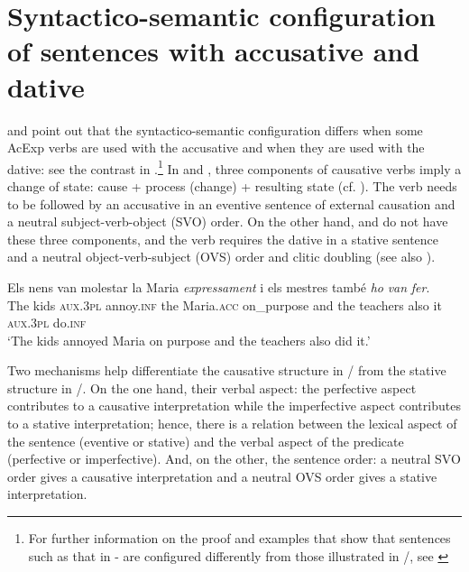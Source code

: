 \documentclass[output=paper,colorlinks,citecolor=brown,nonflat,modfonts]{langsci/langscibook}
\begin{document}
\section{Syntactico-semantic configuration of sentences with accusative and dative}\label{sec:royo:2}

\citet{Ynglès1991} and \citet{CabréMateu1998} point out that the syntactico-semantic configuration differs when some AcExp verbs are used with the accusative and when they are used with the dative: see the contrast in .\footnote{For further information on the proof and examples that show that sentences such as that in  - are configured differently from those illustrated in /, see \citet[Section 4.1]{Royo2017}} In  and , three components of causative verbs imply a change of state: cause + process (change) + resulting state (cf. \citealt{LevinRappaportHovav1995, CabréMateu1998, Rossello2008}). The verb needs to be followed by an accusative in an eventive sentence of external causation and a neutral subject-verb-object (SVO) order. On the other hand,  and  do not have these three components, and the verb requires the dative in a stative sentence and a neutral object-verb-subject (OVS) order and clitic doubling (see also ).

\ea%
 \label{ex:royo:3}
 \ea \label{ex:royo:3a}
 \gll Els nens van molestar la Maria \emph{expressament} i els mestres també \emph{ho} \emph{van} \emph{fer}. \\
The kids \textsc{aux.3pl} annoy.\textsc{inf} the Maria.\textsc{acc} on\_purpose     and the teachers also     it  \textsc{aux.3pl} do.\textsc{inf}\\
 \glt ‘The kids annoyed Maria on purpose and the teachers also did it.’
 
 \z
 \z

Two mechanisms help differentiate the causative structure in / from the stative structure in /. On the one hand, their verbal aspect: the perfective aspect contributes to a causative interpretation while the imperfective aspect contributes to a stative interpretation; hence, there is a relation between the lexical aspect of the sentence (eventive or stative) and the verbal aspect of the predicate (perfective or imperfective). And, on the other, the sentence order: a neutral SVO order gives a causative interpretation and a neutral OVS order gives a stative interpretation.
\end{document}

